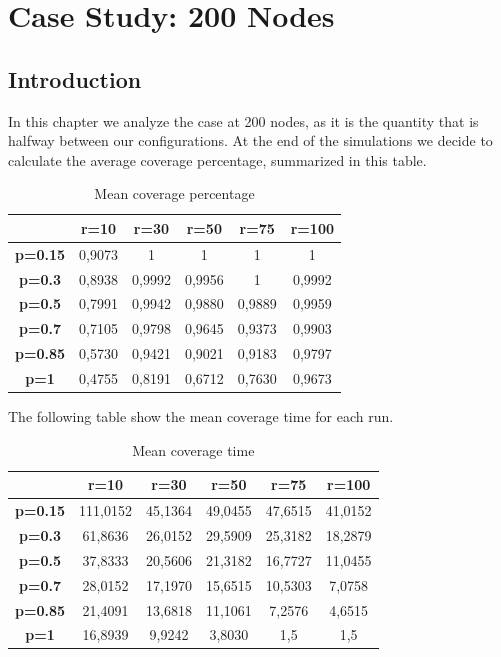 \section{Case Study: 200 Nodes}
\subsection{Introduction}\label{subsec:case-study-200}
In this chapter we analyze the case at 200 nodes, as it is the quantity that is halfway between our configurations. At the end of the simulations we decide to calculate the average coverage percentage, summarized in this table.


\begin{table}[H]
\centering
\begin{tabular}{|c|c|c|c|c|c|}
\hline
 & \textbf{r=10} & \textbf{r=30} & \textbf{r=50} & \textbf{r=75} & \textbf{r=100} \\ \hline
\textbf{p=0.15} & 0,9073 & 1 & 1 & 1 & 1 \\ \hline
\textbf{p=0.3} & 0,8938 & 0,9992 & 0,9956 & 1 & 0,9992 \\ \hline
\textbf{p=0.5} & 0,7991 & 0,9942 & 0,9880 & 0,9889 & 0,9959 \\ \hline
\textbf{p=0.7} & 0,7105 & 0,9798 & 0,9645 & 0,9373 & 0,9903 \\ \hline
\textbf{p=0.85} & 0,5730 & 0,9421 & 0,9021 & 0,9183 & 0,9797 \\ \hline
\textbf{p=1} & 0,4755 & 0,8191 & 0,6712 & 0,7630 & 0,9673 \\ \hline
\end{tabular}
\caption{Mean coverage percentage}
\label{tab:mean-coverage-percentage}
\end{table}

The following table show the mean coverage time for each run.

\begin{table}[H]
\centering
\begin{tabular}{|c|c|c|c|c|c|}
\hline
 & \textbf{r=10} & \textbf{r=30} & \textbf{r=50} & \textbf{r=75} & \textbf{r=100} \\ \hline
\textbf{p=0.15} & 111,0152 & 45,1364 & 49,0455 & 47,6515 & 41,0152 \\ \hline
\textbf{p=0.3} & 61,8636 & 26,0152 & 29,5909 & 25,3182 & 18,2879 \\ \hline
\textbf{p=0.5} & 37,8333 & 20,5606 & 21,3182 & 16,7727 & 11,0455 \\ \hline
\textbf{p=0.7} & 28,0152 & 17,1970 & 15,6515 & 10,5303 & 7,0758 \\ \hline
\textbf{p=0.85} & 21,4091 & 13,6818 & 11,1061 & 7,2576 & 4,6515 \\ \hline
\textbf{p=1} & 16,8939 & 9,9242 & 3,8030 & 1,5 & 1,5 \\ \hline
\end{tabular}
\caption{Mean coverage time}
\label{tab:mean-coverage-time}
\end{table}


